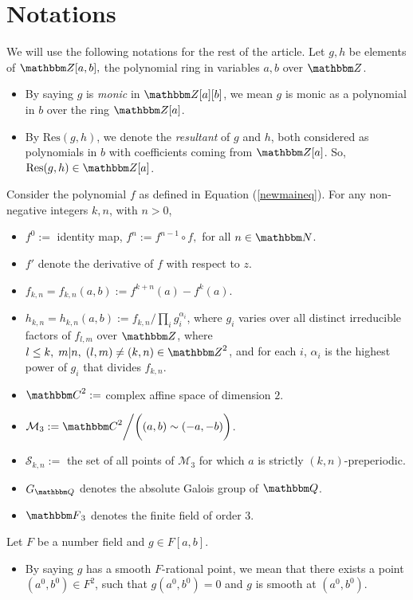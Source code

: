 \documentclass[reqno]{amsart}
\renewcommand{\eqref}[1]{(\ref{#1})}
\numberwithin{equation}{section}
\theoremstyle{plain}
\theoremstyle{definition}
\theoremstyle{definition}
\newcommand{\Q}{{\mathbbm Q}}
\newcommand{\Z}{{\mathbbm Z}}
\newcommand{\C}{{\mathbbm C}}
\newcommand{\N}{{\mathbbm N}}
\newcommand{\F}{{\mathbbm F}}
\begin{document}
\section{Notations}\label{notations}
    We will use the following notations for the rest of the article. Let $g,h$ be elements of $\Z[a,b],$ the polynomial ring in variables $a,b$ over $\Z$. 
    \begin{itemize}
        \item By saying $g$ is \emph{monic} in $\Z[a][b]$, we mean $g$ is monic as a polynomial in $b$ over the ring $\Z[a]$.
        \item By $\mbox{Res}(g,h)$, we denote the \emph{resultant} of $g$ and $h$, both considered as polynomials in $b$ with coefficients coming from $\Z[a]$. So, $\mbox{Res}(g,h)\in \Z[a]$.
    \end{itemize}
    Consider the polynomial $f$ as defined in Equation \eqref{newmaineq}. For any non-negative integers $k,n$, with $n>0$,  
    \begin{itemize}
        \item $f^{0}:=$ identity map, $f^{n}:=f^{n-1} \circ f, $ for all $ n\in \N$.
        \item $f'$ denote the derivative of $f$ with respect to $z$.
        \item $f_{k,n}=f_{k,n}(a,b):= f^{k+n}(a)-f^{k}(a)$.
        \item $h_{k,n}=h_{k,n}(a,b):= f_{k,n}/\prod_{i} g_{i}^{\alpha_{i}}$, where $g_{i}$ varies over all distinct irreducible factors of $f_{l,m}$ over $\Z$, where $l\leq k,\; m|n,\; (l,m)\neq (k,n)\in \Z^{2}$, and for each $i$, $\alpha_{i}$ is the highest power of $g_{i}$ that divides $f_{k,n}$.
        \item $\C^{2}:=$ complex affine space of dimension $2$.
        \item $\mathcal{M}_{3}:=\C^{2}\bigg/\biggl((a,b)\sim (-a,-b) \biggr)$.
        \item $\mathscr{S}_{k,n}:=$ the set of all points of $\mathcal{M}_{3}$ for which $a$ is strictly $(k,n)$-preperiodic.
        \item $G_{\Q}$ denotes the absolute Galois group of $\Q$.
        \item $\F_{3}$ denotes the finite field of order $3$.
    \end{itemize}
    Let $F$ be a number field and $g\in F[a,b]$.
    \begin{itemize}
        \item By saying $g$ has a smooth $F$-rational point, we mean that there exists a point $(a^{0},b^{0})\in F^{2}$, such that $g(a^{0},b^{0})=0$ and $g$ is smooth at $(a^{0},b^{0})$.    
    \end{itemize}
\end{document}
